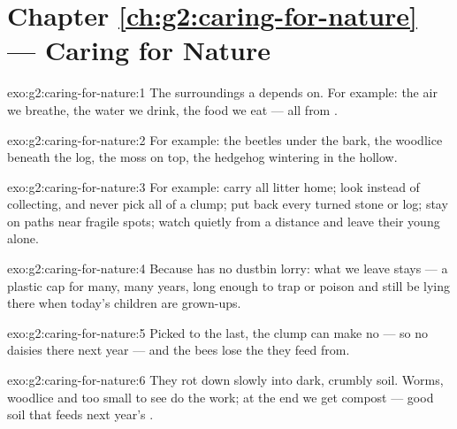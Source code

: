 \section*{Chapter \ref{ch:g2:caring-for-nature} --- Caring for Nature}

\begin{solution}{exo:g2:caring-for-nature:1}
The surroundings a  depends on. For example: the air
we breathe, the water we drink, the food we eat --- all from
.
\end{solution}

\begin{solution}{exo:g2:caring-for-nature:2}
For example: the beetles under the bark, the woodlice beneath the
log, the moss on top, the hedgehog wintering in the hollow.
\end{solution}

\begin{solution}{exo:g2:caring-for-nature:3}
For example: carry all litter home; look instead of collecting,
and never pick all of a clump; put back every turned stone or
log; stay on paths near fragile spots; watch  quietly from
a distance and leave their young alone.
\end{solution}

\begin{solution}{exo:g2:caring-for-nature:4}
Because  has no dustbin lorry: what we leave stays --- a
plastic cap for many, many years, long enough to trap or poison
 and still be lying there when today's children are
grown-ups.
\end{solution}

\begin{solution}{exo:g2:caring-for-nature:5}
Picked to the last, the clump can make no  --- so no daisies
there next year --- and the bees lose the  they feed from.
\end{solution}

\begin{solution}{exo:g2:caring-for-nature:6}
They rot down slowly into dark, crumbly soil. Worms, woodlice and
 too small to see do the work; at the end we get
compost --- good soil that feeds next year's .
\end{solution}


